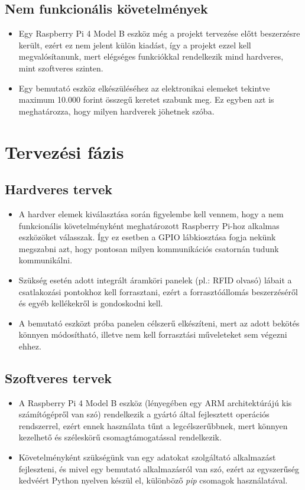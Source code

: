 \documentclass[11pt, a4paper]{article}
\begin{document}
		\subsection{Nem funkcionális követelmények}
			\begin{itemize}
				\justifying
				\item Egy Raspberry Pi 4 Model B eszköz még a projekt tervezése előtt beszerzésre került, ezért ez nem jelent külön kiadást, így a projekt ezzel kell megvalósítanunk, mert elégséges funkciókkal rendelkezik mind hardveres, mint szoftveres szinten.
				
				\item Egy bemutató eszköz elkészüléséhez az elektronikai elemeket tekintve maximum 10.000 forint összegű keretet szabunk meg. Ez egyben azt is meghatározza, hogy milyen hardverek jöhetnek szóba.
			\end{itemize}
		\vfill
	\section{Tervezési fázis}
		\subsection{Hardveres tervek}
			\begin{itemize}
				\justifying
				
				\item A hardver elemek kiválasztása során figyelembe kell vennem, hogy a nem funkcionális követelményként meghatározott Raspberry Pi-hoz alkalmas eszközöket válasszak. Így ez esetben a GPIO lábkiosztása fogja nekünk megszabni azt, hogy pontosan milyen kommunikációs csatornán tudunk kommunikálni. 
				
				\item Szükség esetén adott integrált áramköri panelek (pl.: RFID olvasó) lábait a csatlakozási pontokhoz kell forrasztani, ezért a forrasztóállomás beszerzéséről és egyéb kellékekről is gondoskodni kell.
				
				\item A bemutató eszközt próba panelen célszerű elkészíteni, mert az adott bekötés könnyen módosítható, illetve nem kell forrasztási műveleteket sem végezni ehhez.
			\end{itemize}
		\vfill
		\subsection{Szoftveres tervek}
			\begin{itemize}
				\justifying
				\item A Raspberry Pi 4 Model B eszköz (lényegében egy ARM architektúrájú kis számítógépről van szó) rendelkezik a gyártó által fejlesztett operációs rendszerrel, ezért ennek használata tűnt a legcélszerűbbnek, mert könnyen kezelhető és széleskörű csomagtámogatással rendelkezik.
				
				\item Követelményként szükségünk van egy adatokat szolgáltató alkalmazást fejleszteni, és mivel egy bemutató alkalmazásról van szó, ezért az egyszerűség kedvéért Python nyelven készül el, különböző \emph{pip} csomagok használatával.
			\end{itemize}
		\vfill
	
\end{document}

